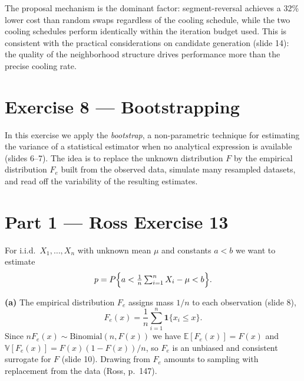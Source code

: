 The proposal mechanism is the dominant factor: segment-reversal achieves a
32\% lower cost than random swaps regardless of the cooling schedule, while
the two cooling schedules perform identically within the iteration budget
used. This is consistent with the practical considerations on candidate
generation (slide 14): the quality of the neighborhood structure drives
performance more than the precise cooling rate. 

\newpage
\section*{Exercise 8 --- Bootstrapping}


In this exercise we apply the \emph{bootstrap}, a non-parametric technique for
estimating the variance of a statistical estimator when no analytical
expression is available (slides 6--7). The idea is to replace the unknown
distribution $F$ by the empirical distribution $F_e$ built from the observed
data, simulate many resampled datasets, and read off the variability of the
resulting estimates.

\section*{Part 1 --- Ross Exercise 13}

For i.i.d.\ $X_1,\dots,X_n$ with unknown mean $\mu$ and constants $a<b$ we
want to estimate
\begin{equation}
    p = P\Bigl\{a < \tfrac{1}{n}\textstyle\sum_{i=1}^{n} X_i - \mu < b\Bigr\}.
    \label{eq:p13}
\end{equation}

\textbf{(a)} The empirical distribution $F_e$ assigns mass $1/n$ to each
observation (slide 8),
\begin{equation}
    F_e(x) = \frac{1}{n}\sum_{i=1}^{n} \mathbf{1}\{x_i \le x\}.
    \label{eq:edf}
\end{equation}
Since $nF_e(x)\sim\mathrm{Binomial}(n,F(x))$ we have
$\mathbb{E}[F_e(x)] = F(x)$ and
$\mathbb{V}[F_e(x)] = F(x)(1-F(x))/n$, so $F_e$ is an unbiased and
consistent surrogate for $F$ (slide 10). Drawing from $F_e$ amounts to sampling
with replacement from the data (Ross, p.\ 147).

